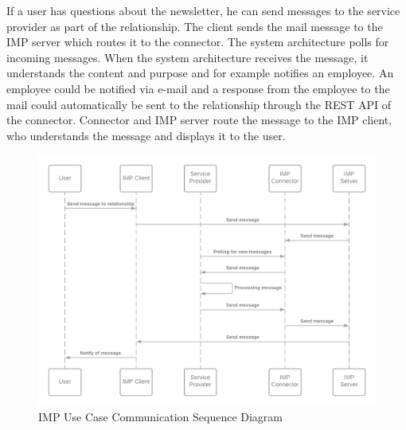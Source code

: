 If a user has questions about the newsletter, he can send messages to the service provider as part of the relationship. The client sends the mail message to the IMP server which routes it to the connector. The system architecture polls for incoming messages. When the system architecture receives the message, it understands the content and purpose and for example notifies an employee. An employee could be notified via e-mail and a response from the employee to the mail could automatically be sent to the relationship through the REST API of the connector. Connector and IMP server route the message to the IMP client, who understands the message and displays it to the user.

\begin{figure}[h]
    \centering
    \caption{IMP Use Case Communication Sequence Diagram}
    \includegraphics[scale=0.3]{Diagrams/IMP Use Case Communication Sequence Diagram.png}
\end{figure}
